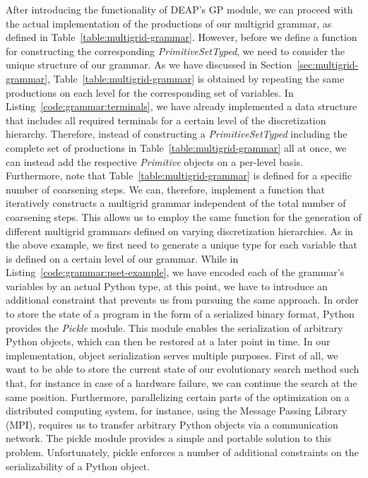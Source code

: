 After introducing the functionality of DEAP's GP module, we can proceed with the actual implementation of the productions of our multigrid grammar, as defined in Table~\ref{table:multigrid-grammar}.
However, before we define a function for constructing the corresponding \emph{PrimitiveSetTyped}, we need to consider the unique structure of our grammar.
As we have discussed in Section~\ref{sec:multigrid-grammar}, Table~\ref{table:multigrid-grammar} is obtained by repeating the same productions on each level for the corresponding set of variables.
In Listing~\ref{code:grammar:terminals}, we have already implemented a data structure that includes all required terminals for a certain level of the discretization hierarchy.
Therefore, instead of constructing a \emph{PrimitiveSetTyped} including the complete set of productions in Table~\ref{table:multigrid-grammar} all at once, we can instead add the respective \emph{Primitive} objects on a per-level basis.
Furthermore, note that Table~\ref{table:multigrid-grammar} is defined for a specific number of coarsening steps.
We can, therefore, implement a function that iteratively constructs a multigrid grammar independent of the total number of coarsening steps.
This allows us to employ the same function for the generation of different multigrid grammars defined on varying discretization hierarchies.
As in the above example, we first need to generate a unique type for each variable that is defined on a certain level of our grammar.
While in Listing~\ref{code:grammar:pset-example}, we have encoded each of the grammar's variables by an actual Python type, at this point, we have to introduce an additional constraint that prevents us from pursuing the same approach.
In order to store the state of a program in the form of a serialized binary format, Python provides the \emph{Pickle} module.
This module enables the serialization of arbitrary Python objects, which can then be restored at a later point in time.
In our implementation, object serialization serves multiple purposes.
First of all, we want to be able to store the current state of our evolutionary search method such that, for instance in case of a hardware failure, we can continue the search at the same position.
Furthermore, parallelizing certain parts of the optimization on a distributed computing system, for instance, using the Message Passing Library (MPI), requires us to transfer arbitrary Python objects via a communication network.
The pickle module provides a simple and portable solution to this problem.
Unfortunately, pickle enforces a number of additional constraints on the serializability of a Python object.
